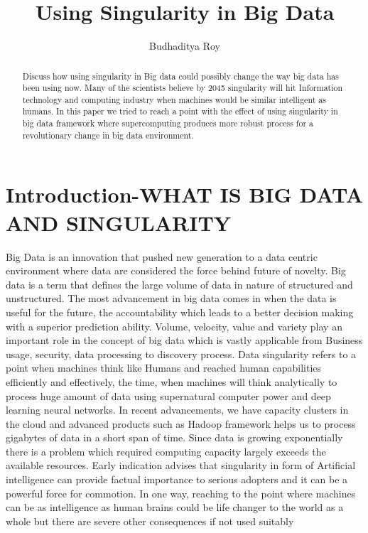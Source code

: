 \documentclass[sigconf]{acmart}
\begin{document}
\title{Using Singularity in Big Data}


\author{Budhaditya Roy}

\renewcommand{\shortauthors}{B. Trovato et al.}


\begin{abstract}
Discuss how using singularity in Big data could possibly change the way big data has been using now. Many of the scientists believe by 2045 singularity will hit Information technology and computing industry when machines would be similar intelligent as humans. In this paper we tried to reach a point with the effect of using singularity in big data framework where supercomputing produces more robust process for a revolutionary change in big data environment. 
\end{abstract}



\maketitle

\section{Introduction-WHAT IS BIG DATA AND SINGULARITY}
Big Data is an innovation that pushed new generation to a data centric environment where data are considered the force behind future of novelty. Big data is a term that defines the large volume of data in nature of structured and unstructured. The most advancement in big data comes in when the data is useful for the future, the accountability which leads to a better decision making with a superior prediction ability. Volume, velocity, value and variety play an important role in the concept of big data which is vastly applicable from Business usage, security, data processing to discovery process. \cite{editor07} Data singularity refers to a point when machines think like Humans and reached human capabilities efficiently and effectively, the time, when machines will think analytically to process huge amount of data using supernatural computer power and deep learning neural networks. In recent advancements, we have capacity clusters in the cloud and advanced products such as Hadoop framework helps us to process gigabytes of data in a short span of time. Since data is growing exponentially there is a problem which required computing capacity largely exceeds the available resources. Early indication advises that singularity in form of Artificial intelligence can provide factual importance to serious adopters and it can be a powerful force for commotion. \cite{editor07}In one way, reaching to the point where machines can be as intelligence as human brains could be life changer to the world as a whole but there are severe other consequences if not used suitably
\end{document}
